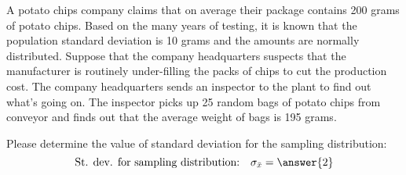 \documentclass{ximera}
\begin{document}
\begin{example}
A potato chips company claims that on average their package contains 200 grams of potato chips. Based on the many years of testing, it is known that the population standard deviation is 10 grams and the amounts are normally distributed. Suppose that the company headquarters suspects that the manufacturer is routinely under-filling the packs of chips to cut the production cost. The company headquarters sends an inspector to the plant to find out what’s going on. The inspector picks up 25 random bags of potato chips from conveyor and finds out that the average weight of bags is 195 grams. 

\begin{question}
Please determine the value of standard deviation for the sampling distribution:
$$\mbox{St. dev. for sampling distribution:}\quad\sigma_{\bar{x}}= \answer{2}$$
\end{question}


\end{example}
\end{document}
